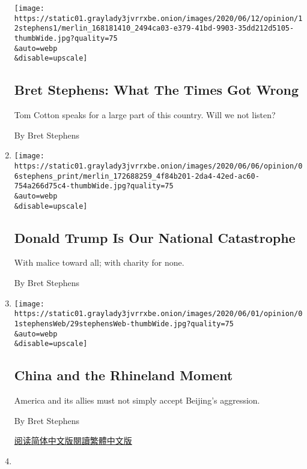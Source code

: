 \begin{enumerate}
  \texttt{[image: https://static01.graylady3jvrrxbe.onion/images/2020/06/12/opinion/12stephens1/merlin\_168181410\_2494ca03-e379-41bd-9903-35dd212d5105-thumbWide.jpg?quality=75\\\&auto=webp\\\&disable=upscale]}

  \hypertarget{bret-stephens-what-the-times-got-wrong}{%
  \subsection{Bret Stephens: What The Times Got
  Wrong}\label{bret-stephens-what-the-times-got-wrong}}

  Tom Cotton speaks for a large part of this country. Will we not
  listen?

  By Bret Stephens
\item
  \href{/2020/06/05/opinion/donald-trump.html}{}

  \texttt{[image: https://static01.graylady3jvrrxbe.onion/images/2020/06/06/opinion/06stephens\_print/merlin\_172688259\_4f84b201-2da4-42ed-ac60-754a266d75c4-thumbWide.jpg?quality=75\\\&auto=webp\\\&disable=upscale]}

  \hypertarget{donald-trump-is-our-national-catastrophe}{%
  \subsection{Donald Trump Is Our National
  Catastrophe}\label{donald-trump-is-our-national-catastrophe}}

  With malice toward all; with charity for none.

  By Bret Stephens
\item
  \href{/2020/05/29/opinion/china-hong-kong.html}{}

  \texttt{[image: https://static01.graylady3jvrrxbe.onion/images/2020/06/01/opinion/01stephensWeb/29stephensWeb-thumbWide.jpg?quality=75\\\&auto=webp\\\&disable=upscale]}

  \hypertarget{china-and-the-rhineland-moment}{%
  \subsection{China and the Rhineland
  Moment}\label{china-and-the-rhineland-moment}}

  America and its allies must not simply accept Beijing's aggression.

  By Bret Stephens

  \href{https://cn.nytimes3xbfgragh.onion/opinion/20200604/china-hong-kong/}{阅读简体中文版}\href{https://cn.nytimes3xbfgragh.onion/opinion/20200604/china-hong-kong/zh-hant/}{閱讀繁體中文版}
\item
  \href{/2020/05/22/opinion/michael-flynn-case-dropped.html}{}


\end{enumerate}
